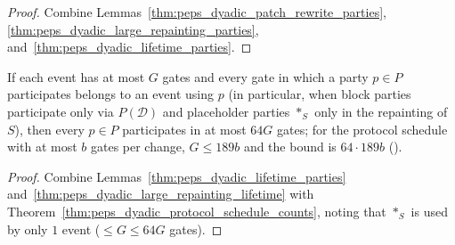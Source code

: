 \begin{proof}\leanok
    Combine Lemmas~\ref{thm:peps_dyadic_patch_rewrite_parties},
    \ref{thm:peps_dyadic_large_repainting_parties},
    and~\ref{thm:peps_dyadic_lifetime_parties}.
\end{proof}

\begin{theorem}
    \label{thm:peps_dyadic_protocol_lifetime}
    \leanok
    If each event has at most $G$ gates and every gate in which a party $p\in P$
    participates belongs to an event using $p$ (in particular, when block parties
    participate only via $P(\mathcal D)$ and placeholder parties $\ast_S$ only in
    the repainting of $S$), then every $p\in P$ participates in at most $64G$
    gates; for the protocol schedule with at most $b$ gates per change, $G\le189b$
    and the bound is $64\cdot189b$
    (\cite[Proposition~7.1, item~2]{OpenAI2026PolynomialPEPS}).
\end{theorem}

\begin{proof}\leanok
    Combine Lemmas~\ref{thm:peps_dyadic_lifetime_parties}
    and~\ref{thm:peps_dyadic_large_repainting_lifetime} with
    Theorem~\ref{thm:peps_dyadic_protocol_schedule_counts}, noting that $\ast_S$ is
    used by only $1$ event ($\le G\le64G$ gates).
\end{proof}
